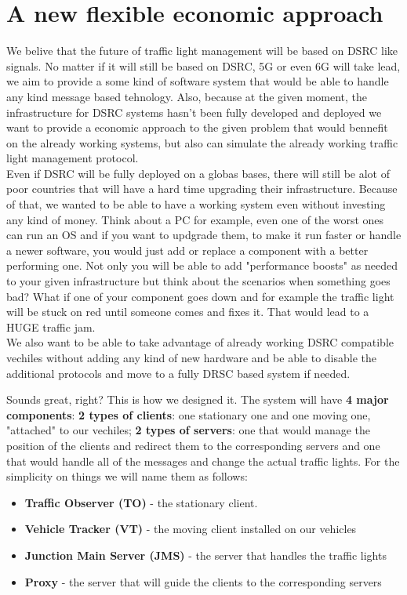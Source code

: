 \documentclass[17pt]{report}
\begin{document}
\pagebreak

\chapter{A new flexible economic approach}
\indent \indent
We belive that the future of traffic light management will be
based on DSRC like signals. No matter if it will still be based 
on DSRC, 5G or even 6G will take lead, we aim to provide a some kind of
software system that would be able to handle any kind message based 
tehnology. Also, because at the given moment, the infrastructure for
DSRC systems hasn't been fully developed and deployed we want to
provide a economic approach to the given problem that would bennefit
on the already working systems, but also can simulate the already
working traffic light management protocol.\\
\indent \indent
Even if DSRC will be fully deployed on a globas bases, there will still be
alot of poor countries that will have a hard time upgrading their infrastructure.
Because of that, we wanted to be able to have a working system even without 
investing any kind of money. Think about a PC for example, even one of the worst
ones can run an OS and if you want to updgrade them, to make it run faster or
handle a newer software, you would just add or replace a component with a better
performing one. Not only you will be able to add "performance boosts" as needed
to your given infrastructure but think about the scenarios when something goes bad?
What if one of your component goes down and for example the traffic light will
be stuck on red until someone comes and fixes it. That would lead to a
HUGE traffic jam.\\
\indent \indent
We also want to be able to take advantage of already working DSRC compatible
vechiles without adding any kind of new hardware  and be able to 
disable the additional protocols and move to a fully DRSC based
system if needed.

Sounds great, right? This is how we designed it. The system will have \textbf{4 major
components}: \textbf{2 types of clients}: one stationary one and one moving one, 
"attached" to our vechiles; \textbf{2 types of servers}: one that would manage the
position of the clients and redirect them to the corresponding servers
and one that would handle all of the messages and change the actual traffic lights.
For the simplicity on things we will name them as follows:
\begin{itemize}
    \item \textbf{Traffic Observer (TO)} - the stationary client.
    \item \textbf{Vehicle Tracker (VT)} - the moving client installed on our vehicles
    \item \textbf{Junction Main Server (JMS)} - the server that handles the traffic lights
    \item \textbf{Proxy} - the server that will guide the clients to the corresponding
    servers
\end{itemize}
\end{document}
